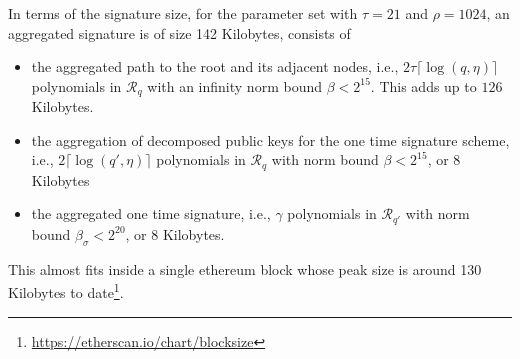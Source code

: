 In terms of the signature size, for the parameter set with $\tau=21$ and $\rho=1024$,
an aggregated signature is of size 142 Kilobytes, consists of 
\begin{itemize}
  \item the aggregated path to the root and its adjacent nodes, i.e., $2\tau\lceil\log(q, \eta)\rceil$ polynomials in $\mathcal{R}_q$ with an infinity norm bound $\beta <2^{15}$. This adds up to $126$ Kilobytes.
  \item the aggregation of decomposed public keys for the one time signature scheme, i.e., $2\lceil\log(q', \eta)\rceil$ polynomials in $\mathcal{R}_{q}$ with norm bound $\beta < 2^{15}$, or $8$ Kilobytes 
  \item the aggregated one time signature, i.e., $\gamma$ polynomials in $\mathcal{R}_{q'}$ with norm bound $\beta_\sigma < 2^{20}$, or $8$ Kilobytes.
\end{itemize}
This almost fits inside a single ethereum block whose peak size is around 130 Kilobytes to date\footnote{\url{https://etherscan.io/chart/blocksize}}.


